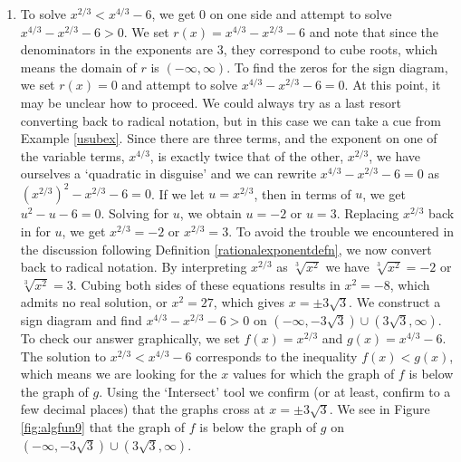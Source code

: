 {
\begin{enumerate}

\item  To solve $x^{2/3} < x^{4/3} - 6$, we get $0$ on one side and attempt to solve $x^{4/3} - x^{2/3} - 6 > 0$.  We set $r(x) = x^{4/3} - x^{2/3} - 6$ and note that since the denominators in the exponents are $3$, they correspond to cube roots, which means the domain of $r$ is $(-\infty, \infty)$. To find the zeros for the sign diagram, we set $r(x) = 0$ and attempt to solve $x^{4/3} - x^{2/3} - 6 = 0$.  At this point, it may be unclear how to proceed.  We could always try as a last resort converting back to radical notation,  but in this case we can take a cue from Example \ref{usubex}.  Since there are three terms, and the exponent on one of the variable terms, $x^{4/3}$, is exactly twice that of the other, $x^{2/3}$, we have ourselves a `quadratic in disguise' and we can rewrite  $ x^{4/3} - x^{2/3} - 6 = 0$ as $\left(x^{2/3}\right)^2 - x^{2/3} - 6=0$.  If we let $u = x^{2/3}$, then in terms of $u$, we get $u^2 - u - 6 = 0$.  Solving for $u$, we obtain $u = -2$ or $u = 3$.  Replacing $x^{2/3}$ back in for $u$, we get $x^{2/3} = -2$ or $x^{2/3} = 3$.  To avoid the trouble we encountered in the discussion following Definition \ref{rationalexponentdefn}, we now convert back to radical notation.  By interpreting $x^{2/3}$ as $\sqrt[3]{x^2}$ we have $\sqrt[3]{x^2} = -2$ or $\sqrt[3]{x^2}= 3$.  Cubing both sides of these equations results in $x^2 = -8$, which admits no real solution, or $x^2 = 27$, which gives $x = \pm 3 \sqrt{3}$.  We construct a sign diagram and find $x^{4/3} - x^{2/3} - 6 > 0$ on $\left(-\infty, -3 \sqrt{3}\right)\cup \left(3 \sqrt{3}, \infty\right)$.  To check our answer graphically, we set $f(x) = x^{2/3}$ and $g(x) = x^{4/3}-6$.  The solution to  $x^{2/3} < x^{4/3} - 6$ corresponds to the inequality $f(x) < g(x)$, which means we are looking for the $x$ values for which the graph of $f$ is below the graph of $g$.  Using the `Intersect' tool we confirm (or at least, confirm to a few decimal places) that the graphs cross at $x= \pm 3\sqrt{3}$.  We see in Figure \ref{fig:algfun9} that the graph of $f$  is below the graph of $g$  on $\left(-\infty, -3 \sqrt{3}\right)\cup \left(3 \sqrt{3}, \infty\right)$.


\end{enumerate}}
